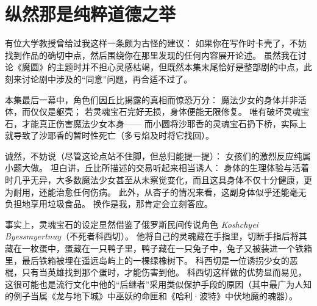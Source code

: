 \chapter[纵然那是纯粹道德之举]{纵然那是纯粹道德之举}



有位大学教授曾给过我这样一条颇为古怪的建议：
如果你在写作时卡壳了，不妨找到作品的确切中点，然后围绕你在那里发现的任何内容展开论述。
虽然我在讨论《魔圆》的主题时并不担心灵感枯竭，但既然本集末尾恰好是整部剧的中点，此刻来讨论剧中涉及的“同意”问题，再合适不过了。

本集最后一幕中，角色们因丘比揭露的真相而惊恐万分：
魔法少女的身体并非活体，而仅仅是躯壳；
若灵魂宝石完好无损，身体便能无限修复。
唯有破坏灵魂宝石，才能真正伤害魔法少女本身——
而小圆将沙耶香的灵魂宝石扔下桥，实际上就导致了沙耶香的暂时性死亡（多亏焰及时将它找回）。

诚然，不妨说（尽管这论点站不住脚，但总归能提一提）：
女孩们的激烈反应纯属小题大做。
坦白讲，丘比所描述的交易听起来相当诱人：
身体的生理体验与活着时几乎无异，大多数魔法少女甚至从未察觉变化，而且这具身体不仅十分健康，更为耐用，还能治愈任何伤病。
此外，从杏子的情况来看，这副身体似乎还能毫无负担地享用垃圾食品。
换作是我，那肯定会立刻答应。

事实上，灵魂宝石的设定显然借鉴了俄罗斯民间传说角色 \emph{Koshchyei Byessmyertnuy}（不死者科西切）。
他将自己的灵魂藏在手指里，切断手指后将其藏在一枚蛋中，蛋藏在一只鸭子里，鸭子藏在一只兔子中，兔子又被装进一个铁箱里，最后铁箱被埋在遥远岛屿上的一棵绿橡树下。
科西切是一位诱拐少女的恶棍，只有当英雄找到那个蛋时，才能伤害到他\cite{frazer1982external-soul}。
科西切这样做的优势显而易见，这很可能也是流行文化中他的“后继者”采用类似保护手段的原因（其中最广为人知的例子当属《龙与地下城》\cite{wilkes2003lich}中巫妖的命匣和《哈利·波特》\cite{rowling2005half-blood-prince}中伏地魔的魂器）。

